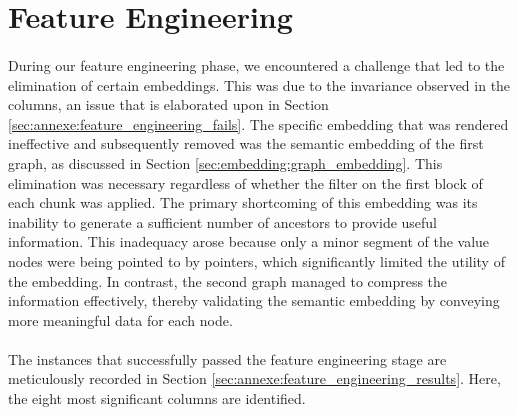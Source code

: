\section{Feature Engineering}
\paragraph{}During our feature engineering phase, we encountered a challenge that led to the elimination of certain embeddings. This was due to the invariance observed in the columns, an issue that is elaborated upon in Section \ref{sec:annexe:feature_engineering_fails}. The specific embedding that was rendered ineffective and subsequently removed was the semantic embedding of the first graph, as discussed in Section \ref{sec:embedding:graph_embedding}. This elimination was necessary regardless of whether the filter on the first block of each chunk was applied. The primary shortcoming of this embedding was its inability to generate a sufficient number of ancestors to provide useful information. This inadequacy arose because only a minor segment of the value nodes were being pointed to by pointers, which significantly limited the utility of the embedding. In contrast, the second graph managed to compress the information effectively, thereby validating the semantic embedding by conveying more meaningful data for each node.

\paragraph{}The instances that successfully passed the feature engineering stage are meticulously recorded in Section \ref{sec:annexe:feature_engineering_results}. Here, the eight most significant columns are identified.